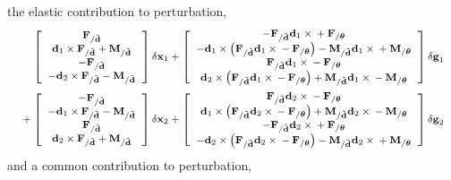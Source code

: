 \documentclass[10pt,dvips,fleqn,subeqn]{report}
\newcommand{\T}[1]{\bm{\mathbf{#1}}}
\begin{document}
%
%
%
the elastic contribution to perturbation,
\begin{align}
	\footnotesize
	\sqbr{\cvvect{
		\T{F}_{/\tilde{\T{d}}} \\
		\T{d}_1 \times \T{F}_{/\tilde{\T{d}}}
			+ \T{M}_{/\tilde{\T{d}}} \\
		- \T{F}_{/\tilde{\T{d}}} \\
		- \T{d}_2 \times \T{F}_{/\tilde{\T{d}}} 
			- \T{M}_{/\tilde{\T{d}}}
	}} \delta\T{x}_1
%
	+ \sqbr{\cvvect{
		- \T{F}_{/\tilde{\T{d}}} \T{d}_1 \times{}
			+ \T{F}_{/\T{\theta}} \\
		- \T{d}_1 \times \plbr{
			\T{F}_{/\tilde{\T{d}}} \T{d}_1 \times{}
			- \T{F}_{/\T{\theta}}
		}
			- \T{M}_{/\tilde{\T{d}}} \T{d}_1\times{}
			+ \T{M}_{/\T{\theta}} \\
		\T{F}_{/\tilde{\T{d}}} \T{d}_1 \times{}
			- \T{F}_{/\T{\theta}} \\
		\T{d}_2 \times \plbr{
			\T{F}_{/\tilde{\T{d}}} \T{d}_1 \times{}
			- \T{F}_{/\T{\theta}}
		}
			+ \T{M}_{/\tilde{\T{d}}} \T{d}_1\times{}
			- \T{M}_{/\T{\theta}}
	}} \delta\T{g}_1
	& \nonumber \\
%
	\footnotesize
	\mbox{} 
	+ \sqbr{\cvvect{
		- \T{F}_{/\tilde{\T{d}}} \\
		- \T{d}_1 \times \T{F}_{/\tilde{\T{d}}}
			- \T{M}_{/\tilde{\T{d}}} \\
		\T{F}_{/\tilde{\T{d}}} \\
		\T{d}_2 \times \T{F}_{/\tilde{\T{d}}}
			+ \T{M}_{/\tilde{\T{d}}}
	}} \delta\T{x}_2
%
	+ \sqbr{\cvvect{
		\T{F}_{/\tilde{\T{d}}} \T{d}_2 \times{}
			- \T{F}_{/\T{\theta}} \\
		\T{d}_1 \times \plbr{
			\T{F}_{/\tilde{\T{d}}} \T{d}_2 \times{}
			- \T{F}_{/\T{\theta}}
		}
			+ \T{M}_{/\tilde{\T{d}}} \T{d}_2\times{}
			- \T{M}_{/\T{\theta}} \\
		- \T{F}_{/\tilde{\T{d}}} \T{d}_2 \times{}
			+ \T{F}_{/\T{\theta}} \\
		- \T{d}_2 \times \plbr{
			\T{F}_{/\tilde{\T{d}}} \T{d}_2 \times{}
			- \T{F}_{/\T{\theta}}
		}
			- \T{M}_{/\tilde{\T{d}}} \T{d}_2\times{}
			+ \T{M}_{/\T{\theta}}
	}} \delta\T{g}_2
	&
	\label{eq:deformable-joint-perturb-elastic}
\end{align}
%
%
%
and a common contribution to perturbation,
\end{document}
